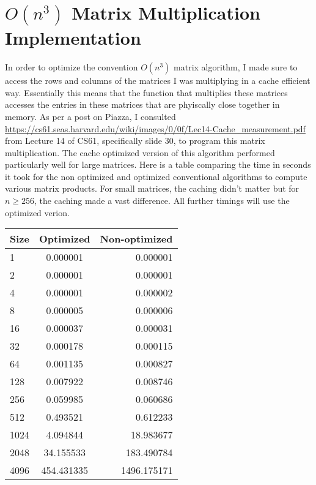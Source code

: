 \documentclass{article}
\begin{document}
\section{$O(n^3)$ Matrix Multiplication Implementation}
In order to optimize the convention $O(n^3)$ matrix algorithm, I made sure to access the rows and columns of the matrices I was multiplying in a cache efficient way. Essentially this means that the function that multiplies these matrices accesses the entries in these matrices that are phyiscally close together in memory.  As per a post on Piazza, I consulted \url{https://cs61.seas.harvard.edu/wiki/images/0/0f/Lec14-Cache_measurement.pdf} from Lecture 14 of CS61, specifically slide 30, to program this matrix multiplication. The cache optimized version of this algorithm performed particularly well for large matrices.  Here is a table comparing the time in seconds it took for the non optimized and optimized conventional algorithms to compute various matrix products. For small matrices, the caching didn't matter but for $n \geq 256$, the caching made a vast difference.  All further timings will use the optimized verion.  \\
\noindent
\begin{tabular}{l | c | r}
	Size & Optimized & Non-optimized\\
	\hline 
	1 & 0.000001 & 0.000001 \\ 
	2 & 0.000001 & 0.000001 \\ 
	4 & 0.000001 & 0.000002 \\ 
	8 & 0.000005 & 0.000006 \\ 
	16 & 0.000037 & 0.000031 \\ 
	32 & 0.000178 & 0.000115 \\ 
	64 & 0.001135 & 0.000827 \\ 
	128 & 0.007922 & 0.008746 \\ 
	256 & 0.059985 & 0.060686 \\ 
	512 & 0.493521 & 0.612233 \\ 
	1024 & 4.094844 & 18.983677 \\ 
	2048 & 34.155533 & 183.490784 \\ 
	4096 & 454.431335 & 1496.175171
\end{tabular}
\end{document}
